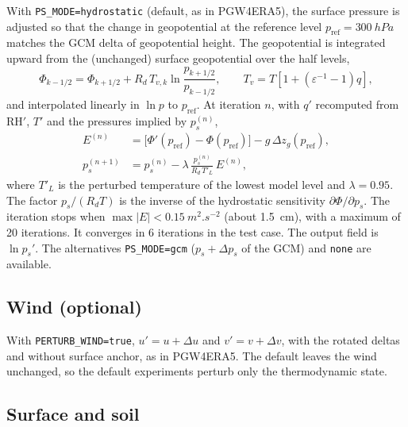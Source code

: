 \documentclass[11pt,a4paper]{article}
\newcommand{\code}[1]{\texttt{#1}}
\begin{document}
With \code{PS\_MODE=hydrostatic} (default, as in PGW4ERA5), the surface
pressure is adjusted so that the change in geopotential at the reference
level $p_{\mathrm{ref}} = \SI{300}{hPa}$ matches the GCM delta of
geopotential height. The geopotential is integrated upward from the
(unchanged) surface geopotential over the half levels,
\begin{equation}
  \Phi_{k-1/2} = \Phi_{k+1/2} + R_d\, T_{v,k} \ln\frac{p_{k+1/2}}{p_{k-1/2}}, \qquad
  T_v = T\left[1 + \left(\varepsilon^{-1} - 1\right) q\right],
\end{equation}
and interpolated linearly in $\ln p$ to $p_{\mathrm{ref}}$. At iteration $n$,
with $q'$ recomputed from $\mathrm{RH}'$, $T'$ and the pressures implied by
$p_s^{(n)}$,
\begin{align}
  E^{(n)} &= \bigl[\Phi'(p_{\mathrm{ref}}) - \Phi(p_{\mathrm{ref}})\bigr] - g\,\Delta z_g(p_{\mathrm{ref}}), \\
  p_s^{(n+1)} &= p_s^{(n)} - \lambda\, \frac{p_s^{(n)}}{R_d\, T'_L}\, E^{(n)},
\end{align}
where $T'_L$ is the perturbed temperature of the lowest model level and
$\lambda = 0.95$. The factor $p_s/(R_d T)$ is the inverse of the hydrostatic
sensitivity $\partial\Phi/\partial p_s$. The iteration stops when
$\max|E| < \SI{0.15}{m^2.s^{-2}}$ (about \SI{1.5}{cm}), with a maximum of 20
iterations. It converges in 6 iterations in the test case. The output field is
$\ln p_s'$. The alternatives \code{PS\_MODE=gcm} ($p_s + \Delta p_s$ of the
GCM) and \code{none} are available.

\subsection{Wind (optional)}

With \code{PERTURB\_WIND=true}, $u' = u + \Delta u$ and $v' = v + \Delta v$,
with the rotated deltas and without surface anchor, as in PGW4ERA5. The
default leaves the wind unchanged, so the default experiments perturb only
the thermodynamic state.

\subsection{Surface and soil}
\end{document}
